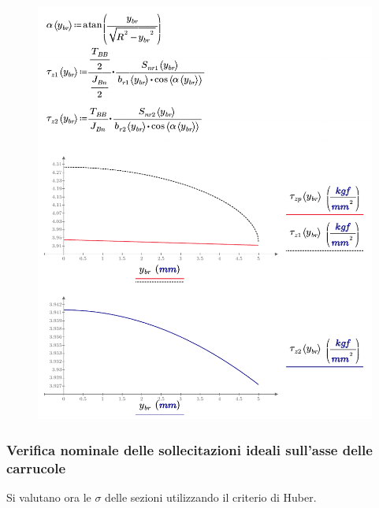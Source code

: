\begin{figure}[H]
\centering
  \includegraphics[width=.68\textwidth]{imgs/MathAsse8_2}
\caption{}
\label{fig:MathAsse8_2}
\end{figure}

\subsubsection{Verifica nominale delle sollecitazioni ideali sull'asse delle carrucole}
Si valutano ora le $\sigma$ delle sezioni utilizzando il criterio di Huber. 

